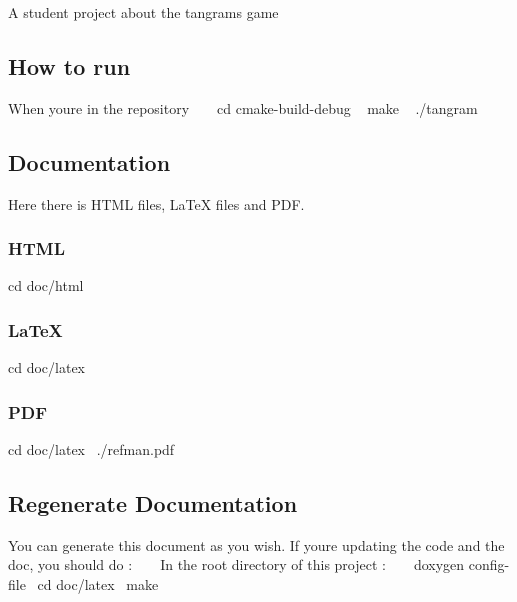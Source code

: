 A student project about the tangram\textquotesingle{}s game

\subsection*{How to run}

When you\textquotesingle{}re in the repository ~\newline
~\newline
 {\ttfamily cd cmake-\/build-\/debug} ~\newline
 {\ttfamily make} ~\newline
 {\ttfamily ./tangram}

\subsection*{Documentation}

Here there is H\+T\+ML files, La\+TeX files and P\+DF. \subsubsection*{H\+T\+ML}

{\ttfamily cd doc/html} \subsubsection*{La\+TeX}

{\ttfamily cd doc/latex} \subsubsection*{P\+DF}

{\ttfamily cd doc/latex}~\newline
 {\ttfamily ./refman.pdf}

\subsection*{Regenerate Documentation}

You can generate this document as you wish. If you\textquotesingle{}re updating the code and the doc, you should do \+: ~\newline
~\newline
 In the root directory of this project \+: ~\newline
~\newline
 {\ttfamily doxygen config-\/file}~\newline
 {\ttfamily cd doc/latex}~\newline
 {\ttfamily make}~\newline
 